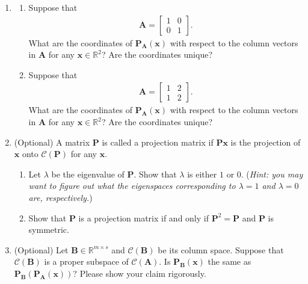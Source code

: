 \documentclass[11pt,letter,notitlepage]{article}
\newcommand{\proj}[2]{\textbf{P}_{#2} (#1)}
\begin{document}
\begin{exercise}[Projection ]
\begin{enumerate}
			\item
			\begin{enumerate}
				\item Suppose that
				\begin{align*}
					\mathbf{A} = \left[
					\begin{matrix}
						1 & 0\\
						0 & 1
					\end{matrix}
					\right] .
				\end{align*}
				What are the coordinates of $\mathbf{P}_{\mathbf{A}}(\mathbf{x})$ with respect to the column vectors in $\mathbf{A}$ for any $\mathbf{x} \in \mathbb{R}^2$? Are the coordinates unique?
				\item Suppose that
				\begin{align*}
					\mathbf{A} = \left[
					\begin{matrix}
						1 & 2\\
						1 & 2
					\end{matrix}
					\right] .
				\end{align*}
				What are the coordinates of $\mathbf{P}_{\mathbf{A}}(\mathbf{x})$ with respect to the column vectors in $\mathbf{A}$ for any $\mathbf{x} \in \mathbb{R}^2$? Are the coordinates unique?
			\end{enumerate}
			
			\item (Optional) A matrix $\mathbf{P}$ is called a projection matrix if $\mathbf{P}\mathbf{x}$ is the projection of $\mathbf{x}$ onto $\mathcal{C}(\mathbf{P})$ for any $\mathbf{x}$.
			\begin{enumerate}
				\item Let $\lambda$ be the eigenvalue of $\mathbf{P}$. Show that $\lambda$ is either $1$ or $0$. (\emph{Hint: you may want to figure out what the eigenspaces corresponding to $\lambda=1$ and $\lambda=0$ are, respectively.})
				\item Show that $\mathbf{P}$ is a projection matrix if and only if $\mathbf{P}^2 = \mathbf{P}$ and $\mathbf{P}$ is symmetric.
			\end{enumerate}
			
			\item (Optional) Let $\mathbf{B} \in \mathbb{R}^{m\times s}$ and $\mathcal{C}(\mathbf{B}) $ be its column space. Suppose that $\mathcal{C}(\mathbf{B})$ is a proper subspace of $ \mathcal{C}(\mathbf{A})$.
			Is $\proj{\mathbf{x}}{\mathbf{B}}$ the same as $\proj{\proj{\mathbf{x}}{\mathbf{A}}}{\mathbf{B}}$? Please show your claim rigorously.
		\end{enumerate}
	\end{exercise}
\end{document}
